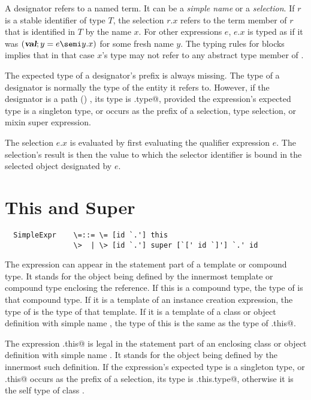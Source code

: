 \documentclass[11pt]{report}
\begin{document}
A designator refers to a named term. It can be a {\em simple name} or
a {\em selection}. If $r$ is a stable identifier of type $T$, the
selection $r.x$ refers to the term member of $r$ that is identified in
$T$ by the name $x$.  For other expressions $e$, $e.x$ is typed as if
it was $(\VAL;y=e\semi y.x)$ for some fresh name $y$. The typing rules
for blocks implies that in that case $x$'s type may not refer to any
abstract type member of \verb@e@.

The expected type of a designator's prefix is always missing.
The
type of a designator is normally the type of the entity it refers
to. However, if the designator is a path () \verb@p@,
its type is \verb@p.type@, provided the expression's expected type is
a singleton type, or \verb@p@ occurs as the prefix of a selection,
type selection, or mixin super expression.

The selection $e.x$ is evaluated by first evaluating the qualifier
expression $e$. The selection's result is then the value to which the
selector identifier is bound in the selected object designated by $e$.

\section{This and Super}
\label{sec:this-super}

\syntax\begin{verbatim}
  SimpleExpr    \=::= \= [id `.'] this
                \>  | \> [id `.'] super [`[' id `]'] `.' id
\end{verbatim}

The expression \verb@this@ can appear in the statement part of a
template or compound type. It stands for the object being defined by
the innermost template or compound type enclosing the reference. If
this is a compound type, the type of \verb@this@ is that compound type.
If it is a template of an instance creation expression, the type of
\verb@this@ is the type of that template. If it is a template of a
class or object definition with simple name \verb@C@, the type of this
is the same as the type of \verb@C.this@.

The expression \verb@C.this@ is legal in the statement part of an
enclosing class or object definition with simple name \verb@C@. It
stands for the object being defined by the innermost such definition.
If the expression's expected type is a singleton type, or
\verb@C.this@ occurs as the prefix of a selection, its type is
\verb@C.this.type@, otherwise it is the self type of class \verb@C@.
\end{document}
